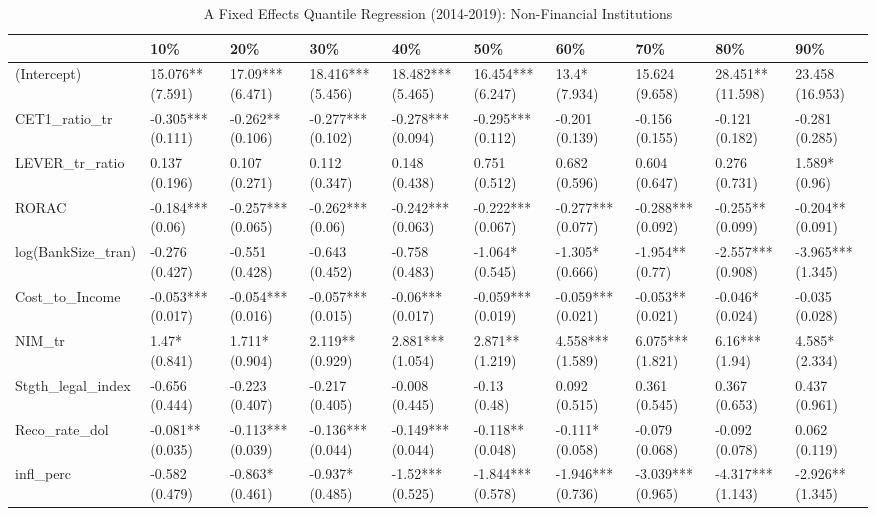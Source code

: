 \begin{table}[ht]
\centering
\caption{A Fixed Effects Quantile Regression (2014-2019): Non-Financial Institutions} 
\begingroup\small
\begin{tabular}{llllllllll}
  \toprule
 & 10\% & 20\% & 30\% & 40\% & 50\% & 60\% & 70\% & 80\% & 90\% \\ 
  \midrule
(Intercept) & 15.076** (7.591) & 17.09*** (6.471) & 18.416*** (5.456) & 18.482*** (5.465) & 16.454*** (6.247) & 13.4* (7.934) & 15.624 (9.658) & 28.451** (11.598) & 23.458 (16.953) \\ 
  CET1\_ratio\_tr & -0.305*** (0.111) & -0.262** (0.106) & -0.277*** (0.102) & -0.278*** (0.094) & -0.295*** (0.112) & -0.201 (0.139) & -0.156 (0.155) & -0.121 (0.182) & -0.281 (0.285) \\ 
  LEVER\_tr\_ratio & 0.137 (0.196) & 0.107 (0.271) & 0.112 (0.347) & 0.148 (0.438) & 0.751 (0.512) & 0.682 (0.596) & 0.604 (0.647) & 0.276 (0.731) & 1.589* (0.96) \\ 
  RORAC & -0.184*** (0.06) & -0.257*** (0.065) & -0.262*** (0.06) & -0.242*** (0.063) & -0.222*** (0.067) & -0.277*** (0.077) & -0.288*** (0.092) & -0.255** (0.099) & -0.204** (0.091) \\ 
  log(BankSize\_tran) & -0.276 (0.427) & -0.551 (0.428) & -0.643 (0.452) & -0.758 (0.483) & -1.064* (0.545) & -1.305* (0.666) & -1.954** (0.77) & -2.557*** (0.908) & -3.965*** (1.345) \\ 
  Cost\_to\_Income & -0.053*** (0.017) & -0.054*** (0.016) & -0.057*** (0.015) & -0.06*** (0.017) & -0.059*** (0.019) & -0.059*** (0.021) & -0.053** (0.021) & -0.046* (0.024) & -0.035 (0.028) \\ 
  NIM\_tr & 1.47* (0.841) & 1.711* (0.904) & 2.119** (0.929) & 2.881*** (1.054) & 2.871** (1.219) & 4.558*** (1.589) & 6.075*** (1.821) & 6.16*** (1.94) & 4.585* (2.334) \\ 
  Stgth\_legal\_index & -0.656 (0.444) & -0.223 (0.407) & -0.217 (0.405) & -0.008 (0.445) & -0.13 (0.48) & 0.092 (0.515) & 0.361 (0.545) & 0.367 (0.653) & 0.437 (0.961) \\ 
  Reco\_rate\_dol & -0.081** (0.035) & -0.113*** (0.039) & -0.136*** (0.044) & -0.149*** (0.044) & -0.118** (0.048) & -0.111* (0.058) & -0.079 (0.068) & -0.092 (0.078) & 0.062 (0.119) \\ 
  infl\_perc & -0.582 (0.479) & -0.863* (0.461) & -0.937* (0.485) & -1.52*** (0.525) & -1.844*** (0.578) & -1.946*** (0.736) & -3.039*** (0.965) & -4.317*** (1.143) & -2.926** (1.345) \\ 

\end{tabular}
\end{table}
